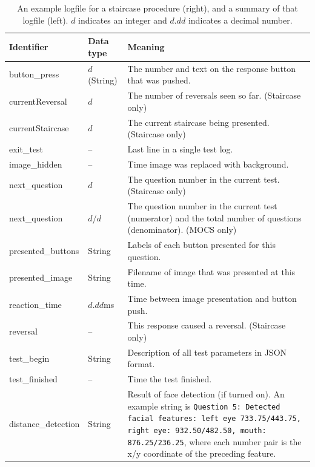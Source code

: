 \documentclass{article}
\begin{document}
\begin{table}
\begin{center}
\begin{tabular}{llp{10cm}}
\hline
Identifier & Data type & Meaning \\
\hline
button\_press       & $d$ (String) &  The number and text on the response button that was pushed. \\
currentReversal     & $d$ & The number of reversals seen so far. (Staircase only)\\
currentStaircase    & $d$ & The current staircase being presented. (Staircase only)\\
exit\_test          &  --  & Last line in a single test log. \\
image\_hidden       &  --  & Time image was replaced with background. \\
next\_question      & $d$ & The question number in the current test. (Staircase only)\\
next\_question      & $d$/$d$ & The question number in the current test (numerator) 
                                and the total number of questions (denominator). (MOCS only)\\
presented\_buttons  & String & Labels of each button presented for this question. \\
presented\_image    & String & Filename of image that was presented at this time. \\
reaction\_time      & $d.dd$ms & Time between image presentation and button push. \\
reversal            & -- & This response caused a reversal. (Staircase only) \\
test\_begin         & String & Description of all test parameters in JSON format. \\
test\_finished      &  -- & Time the test finished.\\
distance\_detection & String & Result of face detection (if turned on). 
                    An example string is {\tt Question 5: Detected facial 
                    features: left eye 733.75/443.75, right eye: 932.50/482.50,
                    mouth: 876.25/236.25}, where each number pair is the x/y 
                    coordinate of the preceding feature.\\
\hline
\end{tabular}
\caption{\label{tab-logs}An example logfile for a staircase procedure (right), and a summary of that logfile (left).
$d$ indicates an integer and $d.dd$ indicates a decimal number.
}
\end{center}
\end{table}
\end{document}
